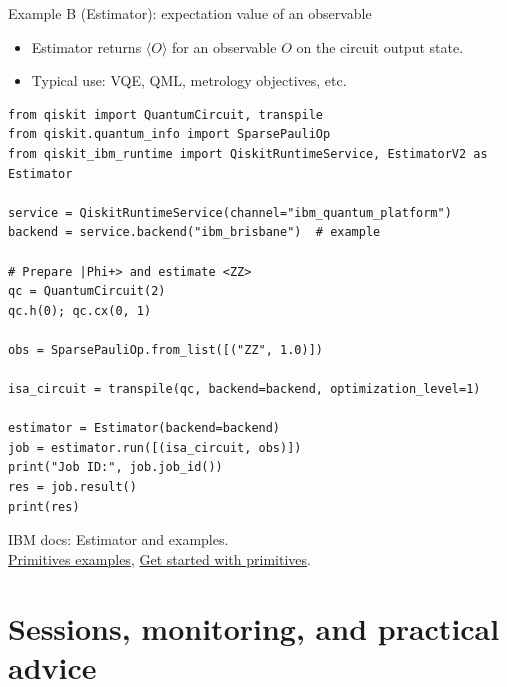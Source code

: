 \documentclass{beamer}
\begin{document}
\begin{frame}[fragile]{Example B (Estimator): expectation value of an observable}
\begin{itemize}
  \item Estimator returns $\langle O\rangle$ for an observable $O$ on the circuit output state.
  \item Typical use: VQE, QML, metrology objectives, etc.
\end{itemize}

\begin{lstlisting}
from qiskit import QuantumCircuit, transpile
from qiskit.quantum_info import SparsePauliOp
from qiskit_ibm_runtime import QiskitRuntimeService, EstimatorV2 as Estimator

service = QiskitRuntimeService(channel="ibm_quantum_platform")
backend = service.backend("ibm_brisbane")  # example

# Prepare |Phi+> and estimate <ZZ>
qc = QuantumCircuit(2)
qc.h(0); qc.cx(0, 1)

obs = SparsePauliOp.from_list([("ZZ", 1.0)])

isa_circuit = transpile(qc, backend=backend, optimization_level=1)

estimator = Estimator(backend=backend)
job = estimator.run([(isa_circuit, obs)])
print("Job ID:", job.job_id())
res = job.result()
print(res)
\end{lstlisting}

\vspace{0.2em}
\scriptsize
IBM docs: Estimator and examples.\\
\href{https://quantum.cloud.ibm.com/docs/guides/primitives-examples}{Primitives examples},
\href{https://quantum.cloud.ibm.com/docs/guides/get-started-with-primitives}{Get started with primitives}.%
\end{frame}

\section{Sessions, monitoring, and practical advice}
\end{document}

